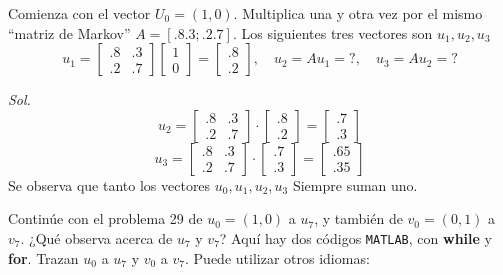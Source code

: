 \begin{problem}
Comienza con el vector $U_{0} = (1,0)$. Multiplica una y otra vez por el mismo ``matriz de Markov'' $A = [{.}8{.}3; {.}2{.}7]$. Los siguientes tres vectores son $u_{1}, u_2 , u_{3}$
\begin{equation*}
	u_{1}= \begin{bmatrix} {.}8 & {.}3\\{.}2 & {.}7 \end{bmatrix}\begin{bmatrix} 1\\0 \end{bmatrix}= \begin{bmatrix} {.}8\\{.}2 \end{bmatrix}, \quad u_2 =Au_{1}=?, \quad u_{3}=Au_2 =?
\end{equation*}
\end{problem}

\textit{ Sol. }
\begin{equation*}
	u_2 =\begin{bmatrix} {.}8 & {.}3\\{.}2 & {.}7 \end{bmatrix}\cdot \begin{bmatrix} {.}8\\{.}2 \end{bmatrix}= \begin{bmatrix} {.}7\\{.}3 \end{bmatrix}
\end{equation*}
\begin{equation*}
	u_{3}=\begin{bmatrix} {.}8 & {.}3\\{.}2 & {.}7 \end{bmatrix}\cdot \begin{bmatrix} {.}7\\{.}3 \end{bmatrix}= \begin{bmatrix} {.}65\\{.}35 \end{bmatrix}
\end{equation*}
Se observa que tanto los vectores $u_{0},u_{1},u_2 ,u_{3}$ Siempre suman uno.

\begin{problem}
Continúe con el problema 29 de $u_{0} = (1,0)$ a $u_{7}$, y también de $v_{0} = (0,1)$ a $v_{7}$.
¿Qué observa acerca de $u_{7}$ y $v_{7}$? Aquí hay dos códigos \texttt{MATLAB}, con \textbf{while} y
\textbf{for}. Trazan $u_{0}$ a $u_{7}$ y $v_{0}$ a $v_{7}$. Puede utilizar otros idiomas:
\end{problem}

